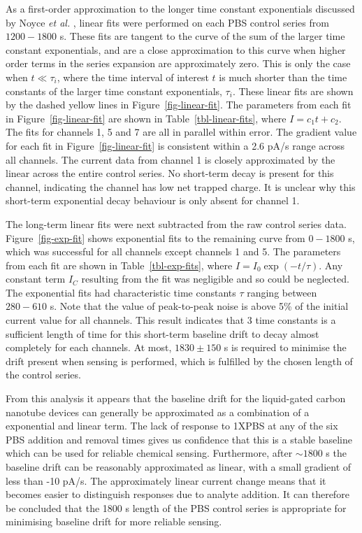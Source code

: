 \documentclass[
  a4paper,
]{scrbook}
\begin{document}
As a first-order approximation to the longer time constant exponentials
discussed by Noyce \emph{et al.} \autocite{Noyce2019}, linear fits were
performed on each PBS control series from \(1200-1800\) s. These fits
are tangent to the curve of the sum of the larger time constant
exponentials, and are a close approximation to this curve when higher
order terms in the series expansion are approximately zero. This is only
the case when \(t\ll\tau_i\), where the time interval of interest \(t\)
is much shorter than the time constants of the larger time constant
exponentials, \(\tau_i\). These linear fits are shown by the dashed
yellow lines in Figure~\ref{fig-linear-fit}. The parameters from each
fit in Figure~\ref{fig-linear-fit} are shown in
Table~\ref{tbl-linear-fits}, where \(I = c_1t + c_2\). The fits for
channels 1, 5 and 7 are all in parallel within error. The gradient value
for each fit in Figure~\ref{fig-linear-fit} is consistent within a 2.6
pA/s range across all channels. The current data from channel 1 is
closely approximated by the linear across the entire control series. No
short-term decay is present for this channel, indicating the channel has
low net trapped charge. It is unclear why this short-term exponential
decay behaviour is only absent for channel 1.

The long-term linear fits were next subtracted from the raw control
series data. Figure~\ref{fig-exp-fit} shows exponential fits to the
remaining curve from \(0-1800\) s, which was successful for all channels
except channels 1 and 5. The parameters from each fit are shown in
Table~\ref{tbl-exp-fits}, where \(I = I_0\exp(-t/\tau)\). Any constant
term \(I_C\) resulting from the fit was negligible and so could be
neglected. The exponential fits had characteristic time constants
\(\tau\) ranging between \(280 - 610\) s. Note that the value of
peak-to-peak noise is above 5\% of the initial current value for all
channels. This result indicates that 3 time constants is a sufficient
length of time for this short-term baseline drift to decay almost
completely for each channels. At most, \(1830\pm150\) s is required to
minimise the drift present when sensing is performed, which is fulfilled
by the chosen length of the control series.

From this analysis it appears that the baseline drift for the
liquid-gated carbon nanotube devices can generally be approximated as a
combination of a exponential and linear term. The lack of response to
1XPBS at any of the six PBS addition and removal times gives us
confidence that this is a stable baseline which can be used for reliable
chemical sensing. Furthermore, after \(\sim 1800\) s the baseline drift
can be reasonably approximated as linear, with a small gradient of less
than -10 pA/s. The approximately linear current change means that it
becomes easier to distinguish responses due to analyte addition. It can
therefore be concluded that the 1800 s length of the PBS control series
is appropriate for minimising baseline drift for more reliable sensing.
\end{document}
